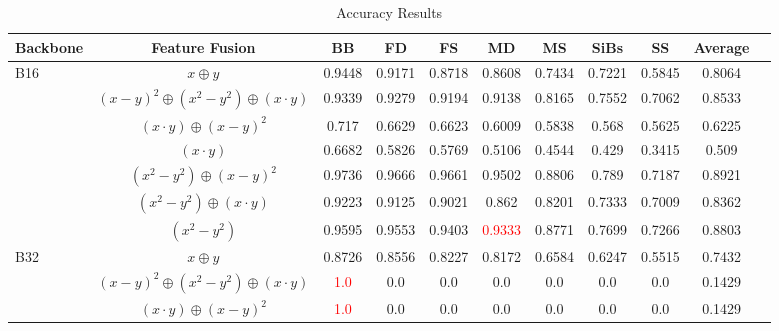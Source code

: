\documentclass{article}
\begin{document}
\begin{table}[htbp]
\centering
\caption{Accuracy Results}
\label{tab:accuracy_results}
\begin{tabular}{lcccccccccc}
\toprule
\textbf{Backbone} & \textbf{Feature Fusion} & \textbf{BB} & \textbf{FD} & \textbf{FS} & \textbf{MD} & \textbf{MS} & \textbf{SiBs} & \textbf{SS} & \textbf{Average} \\
\midrule
\multirow{7}{*}{B16} & $x \oplus y$ & 0.9448 & 0.9171 & 0.8718 & 0.8608 & 0.7434 & 0.7221 & 0.5845 & 0.8064 & \\

& $(x-y)^2 \oplus (x^2-y^2) \oplus (x \cdot y)$ & 0.9339 & 0.9279 & 0.9194 & 0.9138 & 0.8165 & 0.7552 & 0.7062 & 0.8533 & \\

& $(x \cdot y) \oplus (x-y)^2$ & 0.717 & 0.6629 & 0.6623 & 0.6009 & 0.5838 & 0.568 & 0.5625 & 0.6225 & \\

& $(x \cdot y)$ & 0.6682 & 0.5826 & 0.5769 & 0.5106 & 0.4544 & 0.429 & 0.3415 & 0.509 & \\

& $(x^2-y^2) \oplus (x-y)^2$ & 0.9736 & 0.9666 & 0.9661 & 0.9502 & 0.8806 & 0.789 & 0.7187 & 0.8921 & \\

& $(x^2-y^2) \oplus (x \cdot y)$ & 0.9223 & 0.9125 & 0.9021 & 0.862 & 0.8201 & 0.7333 & 0.7009 & 0.8362 & \\

& $(x^2-y^2)$ & 0.9595 & 0.9553 & 0.9403 & \textcolor{red}{0.9333} & 0.8771 & 0.7699 & 0.7266 & 0.8803 & \\
\midrule
\multirow{7}{*}{B32} & $x \oplus y$ & 0.8726 & 0.8556 & 0.8227 & 0.8172 & 0.6584 & 0.6247 & 0.5515 & 0.7432 & \\

& $(x-y)^2 \oplus (x^2-y^2) \oplus (x \cdot y)$ & \textcolor{red}{1.0} & 0.0 & 0.0 & 0.0 & 0.0 & 0.0 & 0.0 & 0.1429 & \\

& $(x \cdot y) \oplus (x-y)^2$ & \textcolor{red}{1.0} & 0.0 & 0.0 & 0.0 & 0.0 & 0.0 & 0.0 & 0.1429 & \\


\end{tabular}
\end{table}
\end{document}
